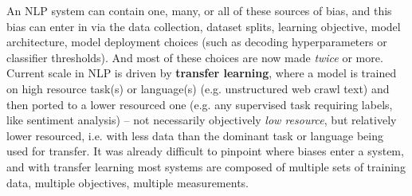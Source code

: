 





An NLP system can contain one, many, or all of these sources of bias, and this bias can enter in via the data collection, dataset splits, learning objective, model architecture, model deployment choices (such as decoding hyperparameters or classifier thresholds). And most of these choices are now made \textit{twice} or more. Current scale in NLP is driven by \textbf{transfer learning}, where a model is trained on high resource task(s) or language(s) (e.g. unstructured web crawl text) and then ported to a lower resourced one (e.g. any supervised task requiring labels, like sentiment analysis) -- not necessarily objectively \textit{low resource}, but relatively lower resourced, i.e. with less data than the dominant task or language being used for transfer. 
It was already difficult to pinpoint where biases enter a system, and with transfer learning most systems are composed of multiple sets of training data, multiple objectives, multiple measurements. 


